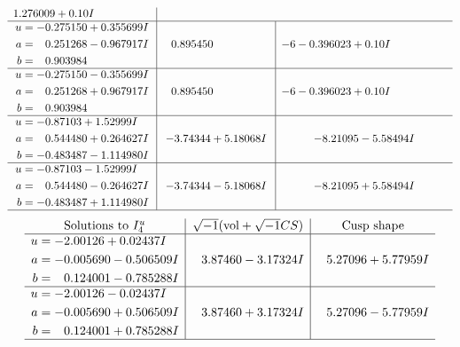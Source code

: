 \documentclass[1p]{elsarticle_modified}
\theoremstyle{definition}
\newcommand{\I}{\sqrt{-1}}
\begin{document}
$$\begin{array}{c|c|c}
1.276009 + 0. 10   I\phantom{ +0.000000I} \\ \hline\begin{aligned}
u &= -0.275150 + 0.355699 I \\
a &= \phantom{-}0.251268 - 0.967917 I \\
b &= \phantom{-}0.903984\phantom{ +0.000000I}\end{aligned}
 & \phantom{-}0.895450\phantom{ +0.000000I} &                  -6
-0.396023 + 0. 10   I\phantom{ +0.000000I} \\ \hline\begin{aligned}
u &= -0.275150 - 0.355699 I \\
a &= \phantom{-}0.251268 + 0.967917 I \\
b &= \phantom{-}0.903984\phantom{ +0.000000I}\end{aligned}
 & \phantom{-}0.895450\phantom{ +0.000000I} &                  -6
-0.396023 + 0. 10   I\phantom{ +0.000000I} \\ \hline\begin{aligned}
u &= -0.87103 + 1.52999 I \\
a &= \phantom{-}0.544480 + 0.264627 I \\
b &= -0.483487 - 1.114980 I\end{aligned}
 & -3.74344 + 5.18068 I & -8.21095 - 5.58494 I \\ \hline\begin{aligned}
u &= -0.87103 - 1.52999 I \\
a &= \phantom{-}0.544480 - 0.264627 I \\
b &= -0.483487 + 1.114980 I\end{aligned}
 & -3.74344 - 5.18068 I & -8.21095 + 5.58494 I\\
 \hline 
 \end{array}$$\newpage$$\begin{array}{c|c|c}  
\text{Solutions to }I^u_{4}& \I (\text{vol} + \sqrt{-1}CS) & \text{Cusp shape}\\
 \hline 
\begin{aligned}
u &= -2.00126 + 0.02437 I \\
a &= -0.005690 - 0.506509 I \\
b &= \phantom{-}0.124001 - 0.785288 I\end{aligned}
 & \phantom{-}3.87460 - 3.17324 I & \phantom{-}5.27096 + 5.77959 I \\ \hline\begin{aligned}
u &= -2.00126 - 0.02437 I \\
a &= -0.005690 + 0.506509 I \\
b &= \phantom{-}0.124001 + 0.785288 I\end{aligned}
 & \phantom{-}3.87460 + 3.17324 I & \phantom{-}5.27096 - 5.77959 I\\
 \hline 
 \end{array}$$\newpage
\end{document}
